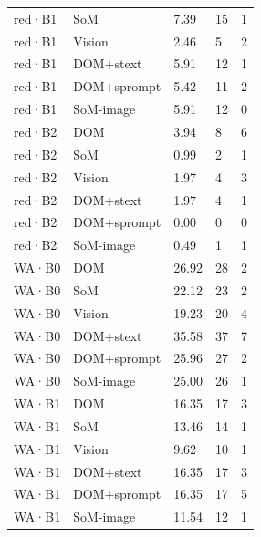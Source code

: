 \begin{table}[tp]
\begin{tabular}{@{}lllll@{}}
red·B1 & SoM & 7.39 & 15 & 1 \\
red·B1 & Vision & 2.46 & 5 & 2 \\
red·B1 & DOM+\allowbreak{}stext & 5.91 & 12 & 1 \\
red·B1 & DOM+\allowbreak{}sprompt & 5.42 & 11 & 2 \\
red·B1 & SoM-image & 5.91 & 12 & 0 \\
red·B2 & DOM & 3.94 & 8 & 6 \\
red·B2 & SoM & 0.99 & 2 & 1 \\
red·B2 & Vision & 1.97 & 4 & 3 \\
red·B2 & DOM+\allowbreak{}stext & 1.97 & 4 & 1 \\
red·B2 & DOM+\allowbreak{}sprompt & 0.00 & 0 & 0 \\
red·B2 & SoM-image & 0.49 & 1 & 1 \\
WA·B0 & DOM & 26.92 & 28 & 2 \\
WA·B0 & SoM & 22.12 & 23 & 2 \\
WA·B0 & Vision & 19.23 & 20 & 4 \\
WA·B0 & DOM+\allowbreak{}stext & 35.58 & 37 & 7 \\
WA·B0 & DOM+\allowbreak{}sprompt & 25.96 & 27 & 2 \\
WA·B0 & SoM-image & 25.00 & 26 & 1 \\
WA·B1 & DOM & 16.35 & 17 & 3 \\
WA·B1 & SoM & 13.46 & 14 & 1 \\
WA·B1 & Vision & 9.62 & 10 & 1 \\
WA·B1 & DOM+\allowbreak{}stext & 16.35 & 17 & 3 \\
WA·B1 & DOM+\allowbreak{}sprompt & 16.35 & 17 & 5 \\
WA·B1 & SoM-image & 11.54 & 12 & 1 \\
\bottomrule
\end{tabular}
\end{table}
